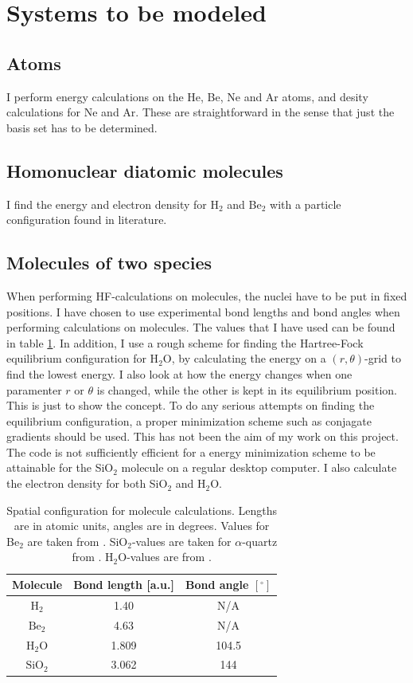 \documentclass[a4paper,10pt, twocolumn, pre]{revtex4}
\begin{document}
\section{Systems to be modeled}

\subsection{Atoms}
I perform energy calculations on the He, Be, Ne and Ar atoms, and desity calculations for Ne and Ar. These are straightforward in the sense that just the basis set has to be determined. 

\subsection{Homonuclear diatomic molecules}
I find the energy and electron density for H$_2$ and Be$_2$ with a particle configuration found in literature. 

\subsection{Molecules of two species}
When performing HF-calculations on molecules, the nuclei have to be put in fixed positions. I have chosen to use experimental bond lengths and bond angles when performing calculations on molecules. The values that I have used can be found in table \ref{tb:configuration}. In addition, I use a rough scheme for finding the Hartree-Fock equilibrium configuration for H$_2$O, by calculating the energy on a $(r, \theta)$-grid to find the lowest energy. I also look at how the energy changes when one paramenter $r$ or $\theta$ is changed, while the other is kept in its equilibrium position. This is just to show the concept. To do any serious attempts on finding the equilibrium configuration, a proper minimization scheme such as conjagate gradients should be used. This has not been the aim of my work on this project. The code is not sufficiently efficient for a energy minimization scheme to be attainable for the SiO$_2$ molecule on a regular desktop computer. I also calculate the electron density for both SiO$_2$ and H$_2$O.



\begin{table}
\caption{Spatial configuration for molecule calculations. Lengths are in atomic units, angles are in degrees. Values for Be$_2$ are taken from \cite{hogberget2013quantum}. SiO$_2$-values are taken for $\alpha$-quartz from \cite{wiberg2001holleman}. H$_2$O-values are from \cite{thijssen2007computational}.}
\label{tb:configuration}
\begin{tabular}[c]{c|c|c}
Molecule & Bond length [a.u.] & Bond angle $[^{\circ}]$ \\
\hline
$\mbox{H}_2$ & 1.40 & N/A \\
$\mbox{Be}_2$ & 4.63 & N/A \\
$\mbox{H}_2\mbox{O}$ & 1.809 & 104.5 \\
$\mbox{SiO}_2$ & 3.062 & 144 \\
\end{tabular}
\end{table}  
\end{document}
